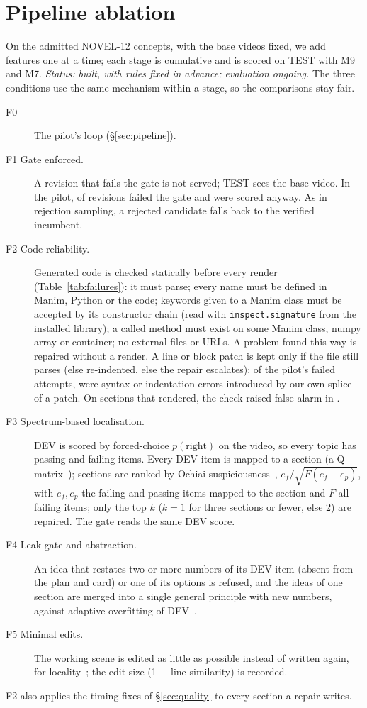 \section{Pipeline ablation}\label{sec:ablation}

On the admitted NOVEL-12 concepts, with the base videos fixed, we add features one at a time; each stage is cumulative
and is scored on TEST with M9 and M7. \emph{Status: built, with rules fixed in advance; evaluation ongoing.} The three conditions use the same mechanism within a stage, so the
comparisons stay fair.

\begin{description}
  \item[F0] The pilot's loop (\S\ref{sec:pipeline}).
  \item[F1 Gate enforced.] A revision that fails the gate is not served; TEST sees the base video. In the pilot, \PilotNotKept{} of
  \PilotRevisions{} revisions failed the gate and were scored anyway. As in rejection sampling, a rejected candidate falls back to the
  verified incumbent.
  \item[F2 Code reliability.] Generated code is checked statically before every render (Table~\ref{tab:failures}):
  it must parse; every name must be defined in Manim, Python or the code; keywords given to a Manim class must be
  accepted by its constructor chain (read with \texttt{inspect.signature} from the installed library); a called
  method must exist on some Manim class, numpy array or container; no external files or URLs. A problem found
  this way is repaired without a render. A line or block patch is kept only if the file still parses (else
  re-indented, else the repair escalates): of the pilot's \FailedAttempts{} failed attempts, \SyntaxAfterPatch{} were
  syntax or indentation errors introduced by our own splice of a patch. On sections that rendered, the check raised \PreflightFP{} false alarm in
  \PreflightN.
  \item[F3 Spectrum-based localisation.] DEV is scored by forced-choice $p(\text{right})$ on the video, so every topic
  has passing and failing items. Every DEV item is mapped to a section (a Q-matrix~\cite{tatsuoka1983}); sections are
  ranked by Ochiai suspiciousness~\cite{ochiai}, $e_f / \sqrt{F (e_f + e_p)}$, with $e_f, e_p$ the failing and passing
  items mapped to the section and $F$ all failing items; only the top $k$ ($k = 1$ for three sections or fewer, else 2)
  are repaired. The gate reads the same DEV score.
  \item[F4 Leak gate and abstraction.] An idea that restates two or more numbers of its DEV item (absent from the plan
  and card) or one of its options is refused, and the ideas of one section are merged into a single general principle
  with new numbers, against adaptive overfitting of DEV~\cite{dwork2015}.
  \item[F5 Minimal edits.] The working scene is edited as little as possible instead of written again, for
  locality~\cite{rome}; the edit size (1 $-$ line similarity) is recorded.
\end{description}
F2 also applies the timing fixes of \S\ref{sec:quality} to every section a repair writes.
